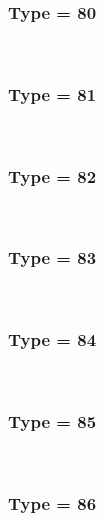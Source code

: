 \documentclass{article}
\begin{document}
        
        
            \subsubsection*{Type = 80}    
            
            \\
        
        
        
            \subsubsection*{Type = 81}    
            
            \\
        
        
        
            \subsubsection*{Type = 82}    
            
            \\
        
        
        
            \subsubsection*{Type = 83}    
            
            \\
        
        
        
            \subsubsection*{Type = 84}    
            
            \\
        
        
        
            \subsubsection*{Type = 85}    
            
            \\
        
        
        
            \subsubsection*{Type = 86}    
            
\end{document}
